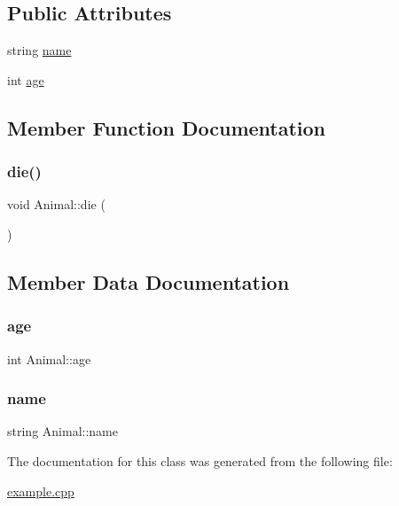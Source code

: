 \subsection*{Public Attributes}
\begin{DoxyCompactItemize}
\item 
string \hyperlink{classAnimal_a9cf3bfd9070daec7b3bbc87cbd958f35}{name}
\item 
int \hyperlink{classAnimal_a31e4a23bef9596927496de4eb6b9c721}{age}
\end{DoxyCompactItemize}


\subsection{Member Function Documentation}
\mbox{\label{classAnimal_a557fe0d71dda75be2f8459ce0d7c2275}} 
\subsubsection{\texorpdfstring{die()}{die()}}
{\footnotesize\ttfamily void Animal\+::die (\begin{DoxyParamCaption}{ }\end{DoxyParamCaption})}



\subsection{Member Data Documentation}
\mbox{\label{classAnimal_a31e4a23bef9596927496de4eb6b9c721}} 
\subsubsection{\texorpdfstring{age}{age}}
{\footnotesize\ttfamily int Animal\+::age}

\mbox{\label{classAnimal_a9cf3bfd9070daec7b3bbc87cbd958f35}} 
\subsubsection{\texorpdfstring{name}{name}}
{\footnotesize\ttfamily string Animal\+::name}



The documentation for this class was generated from the following file\+:\begin{DoxyCompactItemize}
\item 
\hyperlink{example_8cpp}{example.\+cpp}\end{DoxyCompactItemize}
